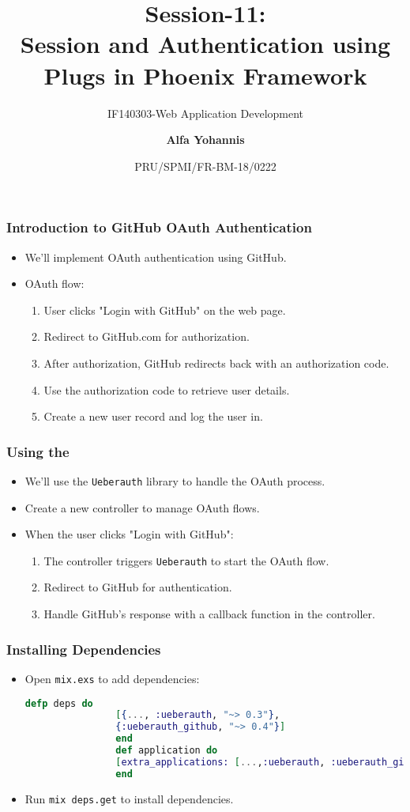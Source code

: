 \documentclass[aspectratio=169, table]{beamer}
\subtitle{IF140303-Web Application Development}
\title{Session-11:\\\LARGE{Session and Authentication using\\Plugs in Phoenix Framework}}
\date[Serial]{\scriptsize{PRU/SPMI/FR-BM-18/0222}}
\author[Pradita]{\small{\textbf{Alfa Yohannis}}}
\begin{document}
	
	\frame{\titlepage}
	
	\begin{frame}
		\frametitle{Introduction to GitHub OAuth Authentication}
		\begin{itemize}
			\item We'll implement OAuth authentication using GitHub.
			\item OAuth flow:
			\begin{enumerate}
				\item User clicks "Login with GitHub" on the web page.
				\item Redirect to GitHub.com for authorization.
				\item After authorization, GitHub redirects back with an authorization code.
				\item Use the authorization code to retrieve user details.
				\item Create a new user record and log the user in.
			\end{enumerate}
		\end{itemize}
	\end{frame}
	
	\begin{frame}
		\frametitle{Using the }
		\begin{itemize}
			\item We'll use the \texttt{Ueberauth} library to handle the OAuth process.
			\item Create a new controller to manage OAuth flows.
			\item When the user clicks "Login with GitHub":
			\begin{enumerate}
				\item The controller triggers \texttt{Ueberauth} to start the OAuth flow.
				\item Redirect to GitHub for authentication.
				\item Handle GitHub's response with a callback function in the controller.
			\end{enumerate}
		\end{itemize}
	\end{frame}
	
	\begin{frame}[fragile]
		\frametitle{Installing Dependencies}
		\begin{itemize}
			\item Open \texttt{mix.exs} to add dependencies:
			\begin{lstlisting}[language=Elixir]
				defp deps do
				[{..., :ueberauth, "~> 0.3"},
				{:ueberauth_github, "~> 0.4"}]
				end
				def application do
				[extra_applications: [...,:ueberauth, :ueberauth_github]]
				end
			\end{lstlisting}
			\item Run \texttt{mix deps.get} to install dependencies.
		\end{itemize}
	\end{frame}
	
\end{document}
